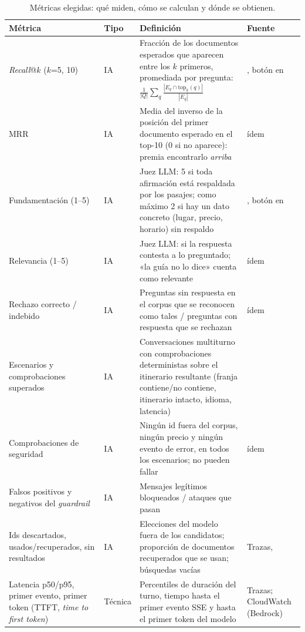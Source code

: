 \begin{table}[t]
\centering\scriptsize
\caption{Métricas elegidas: qué miden, cómo se calculan y dónde se obtienen.}\label{tab:metricas}
\begin{tabularx}{\textwidth}{@{}L{2.55cm}L{0.9cm}YL{3.3cm}@{}}
\toprule
\textbf{Métrica} & \textbf{Tipo} & \textbf{Definición} & \textbf{Fuente} \\
\midrule
\emph{Recall}@$k$ ($k$=5, 10) & IA & Fracción de los documentos esperados que aparecen entre los $k$ primeros, promediada por pregunta: $\frac{1}{|Q|}\sum_q \frac{|E_q \cap \text{top}_k(q)|}{|E_q|}$ & , botón en  \\
MRR & IA & Media del inverso de la posición del primer documento esperado en el top-10 (0 si no aparece): premia encontrarlo \emph{arriba} & ídem \\
Fundamentación (1--5) & IA & Juez LLM: 5 si toda afirmación está respaldada por los pasajes; como máximo 2 si hay un dato concreto (lugar, precio, horario) sin respaldo & , botón en  \\
Relevancia (1--5) & IA & Juez LLM: si la respuesta contesta a lo preguntado; «la guía no lo dice» cuenta como relevante & ídem \\
Rechazo correcto / indebido & IA & Preguntas sin respuesta en el corpus que se reconocen como tales / preguntas con respuesta que se rechazan & ídem \\
Escenarios y comprobaciones superados & IA & Conversaciones multiturno con comprobaciones deterministas sobre el itinerario resultante (franja contiene/no contiene, itinerario intacto, idioma, latencia) &  \\
Comprobaciones de seguridad & IA & Ningún id fuera del corpus, ningún precio y ningún evento de error, en todos los escenarios; no pueden fallar & ídem \\
Falsos positivos y negativos del \emph{guardrail} & IA & Mensajes legítimos bloqueados / ataques que pasan &  \\
Ids descartados, usados/recuperados, sin resultados & IA & Elecciones del modelo fuera de los candidatos; proporción de documentos recuperados que se usan; búsquedas vacías & Trazas,  \\
Latencia p50/p95, primer evento, primer token (TTFT, \emph{time to first token}) & Técnica & Percentiles de duración del turno, tiempo hasta el primer evento SSE y hasta el primer token del modelo & Trazas; CloudWatch (Bedrock) \\

\end{tabularx}
\end{table}
